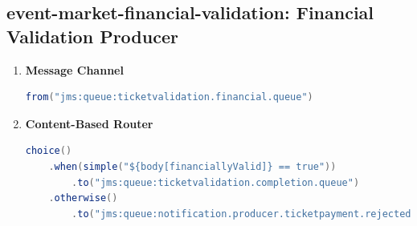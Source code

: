 \documentclass{article}
\begin{document}
\subsection{event-market-financial-validation: Financial Validation Producer}
\begin{enumerate}
    \item \textbf{Message Channel}
\begin{lstlisting}[language=Java, caption={Message Channel for Financial Validation}]
from("jms:queue:ticketvalidation.financial.queue")
\end{lstlisting}
    \item \textbf{Content-Based Router}
\begin{lstlisting}[language=Java, caption={Content-Based Router for Financial Validation}]
choice()
    .when(simple("${body[financiallyValid]} == true"))
        .to("jms:queue:ticketvalidation.completion.queue")
    .otherwise()
        .to("jms:queue:notification.producer.ticketpayment.rejected.queue")
\end{lstlisting}
\end{enumerate}
\end{document}
